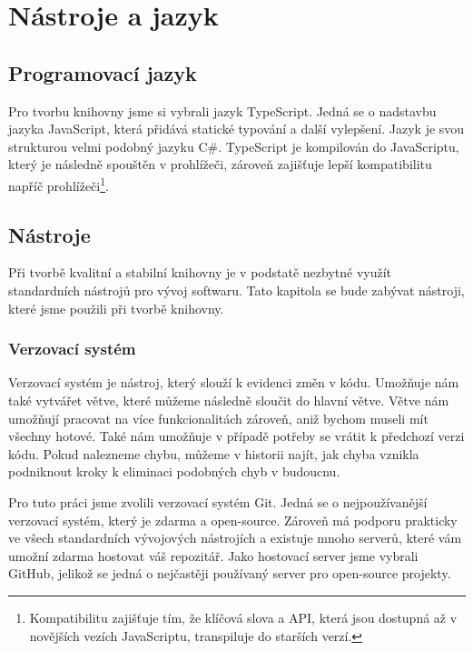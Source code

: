 \chapter{Nástroje a jazyk}
\label{chap:technologies}

\section{Programovací jazyk}
\label{sec:programming-language}

Pro tvorbu knihovny jsme si vybrali jazyk TypeScript\cite{geometryjs:wiki:technologies}. 
Jedná se o nadstavbu jazyka JavaScript, která přidává statické typování a další vylepšení\cite{TypeScript:handbook}. 
Jazyk je svou strukturou velmi podobný jazyku C\#.
TypeScript je kompilován do JavaScriptu\cite{TypeScript}, který je následně spouštěn v prohlížeči, zároveň zajišťuje lepší kompatibilitu napříč prohlížeči\footnote{Kompatibilitu zajišťuje tím, že klíčová slova a API, která jsou dostupná až v novějších vezích JavaScriptu, transpiluje do starších verzí.}\cite{TypeScript:tsconfig}.

\section{Nástroje}
\label{sec:tools}

Při tvorbě kvalitní a stabilní knihovny je v podstatě nezbytné využít standardních nástrojů pro vývoj softwaru. 
Tato kapitola se bude zabývat nástroji, které jsme použili při tvorbě knihovny.

\subsection{Verzovací systém}
\label{subsec:version-control}

Verzovací systém je nástroj, který slouží k evidenci změn v kódu. 
Umožňuje nám také vytvářet větve, které můžeme následně sloučit do hlavní větve\cite{Git:branches,wikipedia:version-control}. 
Větve nám umožňují pracovat na více funkcionalitách zároveň, aniž bychom museli mít všechny hotové. 
Také nám umožňuje v případě potřeby se vrátit k předchozí verzi kódu.
 Pokud nalezneme chybu, můžeme v historii najít, jak chyba vznikla podniknout kroky k eliminaci podobných chyb v budoucnu.

Pro tuto práci jsme zvolili verzovací systém Git. Jedná se o nejpoužívanější verzovací systém, který je zdarma a open-source\cite{Git,geometryjs:wiki:technologies}.
Zároveň má podporu prakticky ve všech standardních vývojových nástrojích a existuje mnoho serverů, které vám umožní zdarma hostovat váš repozitář.
Jako hostovací server jsme vybrali GitHub, jelikož se jedná o nejčastěji používaný server pro open-source projekty\cite{GitHub:about}.

